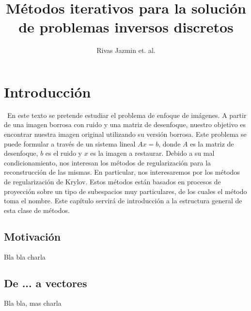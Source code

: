 \documentclass[12pt, oneside]{book}
\title{Métodos iterativos para la solución de problemas inversos discretos}
\author{Rivas Jazmin et. al.}
\date{}
\begin{document}
	\maketitle
	\tableofcontents
	
	
	\chapter{Introducción}
	\ En este texto se pretende estudiar el problema de enfoque de imágenes. A partir de una imagen borrosa con ruido y una matriz de desenfoque, nuestro objetivo es encontrar nuestra imagen original utilizando su versión borrosa. Este problema se puede formular a través de un sistema lineal $Ax = b$, donde $A$ es la matriz de desenfoque, $b$ es el ruido y $x$ es la imagen a restaurar. Debido a su mal condicionamiento, nos interesan los métodos de regularización para la reconstrucción de las mismas. En particular, nos interesaremos por los métodos de regularización de Krylov. Estos métodos están basados en procesos de proyección sobre un tipo de subespacios muy particulares, de los cuales el método toma el nombre. Este capítulo servirá de introducción a la estructura general de esta clase de métodos.
	
	\section{Motivación}
	Bla bla charla
	\section{De ... a vectores}
	Bla bla, mas charla
	
\end{document}
